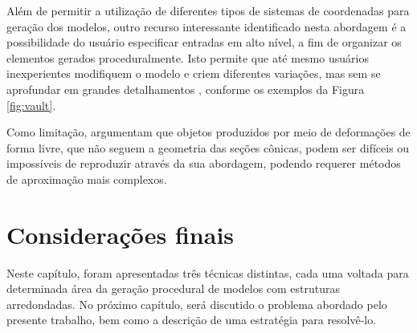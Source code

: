 Além de permitir a utilização de diferentes tipos de sistemas de coordenadas para geração dos modelos, outro recurso interessante identificado nesta abordagem é a possibilidade do usuário especificar entradas em alto nível, a fim de organizar os elementos gerados proceduralmente. Isto permite que até mesmo usuários inexperientes modifiquem o modelo e criem diferentes variações, mas sem se aprofundar em grandes detalhamentos \cite{edelsbrunner2017}, conforme os exemplos da Figura \ref{fig:vault}.

\begin{figure}[h!]
	\centering
	\captionsetup{width=15cm}
	{}	
\end{figure}

Como limitação,  argumentam que objetos produzidos por meio de deformações de forma livre, que não seguem a geometria das seções cônicas, podem ser difíceis ou impossíveis de reproduzir através da sua abordagem, podendo requerer métodos de aproximação mais complexos.

\section{Considerações finais}
\label{sec:consideracoes_capitulo_3}

Neste capítulo, foram apresentadas três técnicas distintas, cada uma voltada para determinada área da geração procedural de modelos com estruturas arredondadas. No próximo capítulo, será discutido o problema abordado pelo presente trabalho, bem como a descrição de uma estratégia para resolvê-lo.
 